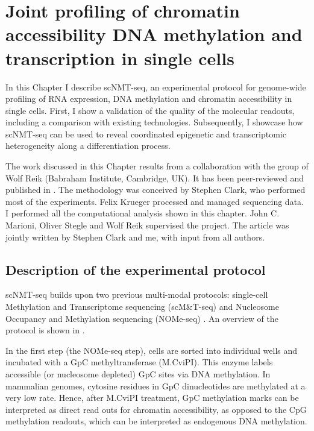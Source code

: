 \graphicspath{{Chapter1/Figs/}}

\chapter{Joint profiling of chromatin accessibility DNA methylation and transcription in single cells}

In this Chapter I describe scNMT-seq, an experimental protocol for genome-wide profiling of RNA expression, DNA methylation and chromatin accessibility in single cells. First, I show a validation of the quality of the molecular readouts, including a comparison with existing technologies. Subsequently, I showcase how scNMT-seq can be used to reveal coordinated epigenetic and transcriptomic heterogeneity along a differentiation process.

The work discussed in this Chapter results from a collaboration with the group of Wolf Reik (Babraham Institute, Cambridge, UK). It has been peer-reviewed and published in \cite{Clark2018}. The methodology was conceived by Stephen Clark, who performed most of the experiments. Felix Krueger processed and managed sequencing data. I performed all the computational analysis shown in this chapter. John C. Marioni, Oliver Stegle and Wolf Reik supervised the project. The article was jointly written by Stephen Clark and me, with input from all authors.

\section{Description of the experimental protocol} \label{section:scnmt_protocol}

scNMT-seq builds upon two previous multi-modal protocols: single-cell Methylation and Transcriptome sequencing (scM\&T-seq) \cite{Angermueller2016} and Nucleosome Occupancy and Methylation sequencing (NOMe-seq) \cite{Kelly2012,Pott2016}. An overview of the protocol is shown in .

In the first step (the NOMe-seq step), cells are sorted into individual wells and incubated with a GpC methyltransferase (M.CviPI). This enzyme labels accessible (or nucleosome depleted) GpC sites via DNA methylation\cite{Kilgore2007, Kelly2012}. In mammalian genomes, cytosine residues in GpC dinucleotides are methylated at a very low rate. Hence, after M.CviPI treatment, GpC methylation marks can be interpreted as direct read outs for chromatin accessibility, as opposed to the CpG methylation readouts, which can be interpreted as endogenous DNA methylation\cite{Kilgore2007, Kelly2012}.

